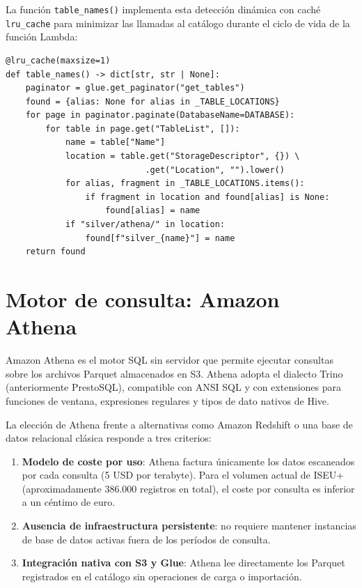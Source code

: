 La función \texttt{table\_names()} implementa esta detección dinámica con caché \texttt{lru\_cache} para minimizar las llamadas al catálogo durante el ciclo de vida de la función Lambda:

\begin{verbatim}
@lru_cache(maxsize=1)
def table_names() -> dict[str, str | None]:
    paginator = glue.get_paginator("get_tables")
    found = {alias: None for alias in _TABLE_LOCATIONS}
    for page in paginator.paginate(DatabaseName=DATABASE):
        for table in page.get("TableList", []):
            name = table["Name"]
            location = table.get("StorageDescriptor", {}) \
                            .get("Location", "").lower()
            for alias, fragment in _TABLE_LOCATIONS.items():
                if fragment in location and found[alias] is None:
                    found[alias] = name
            if "silver/athena/" in location:
                found[f"silver_{name}"] = name
    return found
\end{verbatim}

\section{Motor de consulta: Amazon Athena}

Amazon Athena es el motor SQL sin servidor que permite ejecutar consultas sobre los archivos Parquet almacenados en S3. Athena adopta el dialecto Trino (anteriormente PrestoSQL), compatible con ANSI SQL y con extensiones para funciones de ventana, expresiones regulares y tipos de dato nativos de Hive.

La elección de Athena frente a alternativas como Amazon Redshift o una base de datos relacional clásica responde a tres criterios:

\begin{enumerate}
  \item \textbf{Modelo de coste por uso}: Athena factura únicamente los datos escaneados por cada consulta (5 USD por terabyte). Para el volumen actual de ISEU+ (aproximadamente 386.000 registros en total), el coste por consulta es inferior a un céntimo de euro.
  \item \textbf{Ausencia de infraestructura persistente}: no requiere mantener instancias de base de datos activas fuera de los períodos de consulta.
  \item \textbf{Integración nativa con S3 y Glue}: Athena lee directamente los Parquet registrados en el catálogo sin operaciones de carga o importación.
\end{enumerate}

